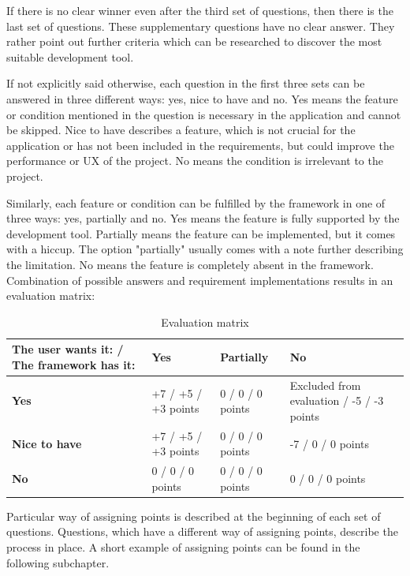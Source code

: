 \documentclass[english,master,public,dept460,male,cpdeclaration,oneside]{diploma}
\begin{document}
If there is no clear winner even after the third set of questions, then there is the last set of questions. These supplementary questions have no clear answer. They rather point out further criteria which can be researched to discover the most suitable development tool.
	
If not explicitly said otherwise, each question in the first three sets can be answered in three different ways: yes, nice to have and no. Yes means the feature or condition mentioned in the question is necessary in the application and cannot be skipped. Nice to have describes a feature, which is not crucial for the application or has not been included in the requirements, but could improve the performance or UX of the project. No means the condition is irrelevant to the project.
	
Similarly, each feature or condition can be fulfilled by the framework in one of three ways: yes, partially and no. Yes means the feature is fully supported by the development tool. Partially means the feature can be implemented, but it comes with a hiccup. The option "partially" usually comes with a note further describing the limitation. No means the feature is completely absent in the framework. Combination of possible answers and requirement implementations results in an evaluation matrix:
	
\begin{table}[!h]
	\centering
	\caption{Evaluation matrix}
	\begin{tabular}{p{3cm} | p{3cm} | p{3cm} | p{3cm}}
		\toprule
		\textbf{The user wants it: / The framework has it:} & \textbf{Yes} & \textbf{Partially} & \textbf{No} \\
		\midrule
		\textbf{Yes} & +7 / +5 / +3 points & 0 / 0 / 0 points & Excluded from evaluation / -5 / -3 points \\
		\midrule
		\textbf{Nice to have} & +7 / +5 / +3 points & 0 / 0 / 0 points & -7 / 0 / 0 points \\
		\midrule
		\textbf{No} & 0 / 0 / 0 points & 0 / 0 / 0 points &  0 / 0 / 0 points \\
		\midrule	
	\end{tabular}
\end{table}

Particular way of assigning points is described at the beginning of each set of questions. Questions, which have a different way of assigning points, describe the process in place. A short example of assigning points can be found in the following subchapter.
\end{document}
